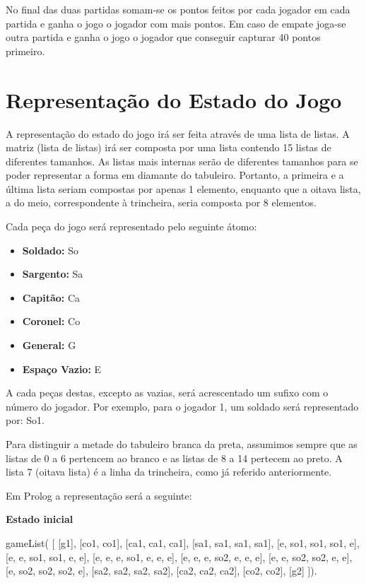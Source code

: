 \documentclass[a4paper]{article}
\begin{document}
No final das duas partidas somam-se os pontos feitos por cada jogador em cada partida e ganha o jogo o jogador com mais pontos. Em caso de empate joga-se outra partida e ganha o jogo o jogador que conseguir capturar 40 pontos primeiro. 

\newpage



\section{Representação do Estado do Jogo}

A representação do estado do jogo irá ser feita através de uma lista de listas. 
A matriz (lista de listas) irá ser composta por uma lista contendo 15 listas de diferentes tamanhos. As listas mais internas serão de diferentes tamanhos para se poder representar a forma em diamante do tabuleiro. Portanto, a primeira e a última lista seriam compostas por apenas 1 elemento, enquanto que a oitava lista, a do meio, correspondente à trincheira, seria composta por 8 elementos. 

Cada peça do jogo será representado pelo seguinte átomo: 

\begin{itemize}
	\item{\textbf{Soldado:} So}
	\item {\textbf{Sargento:} Sa}
	\item{\textbf{Capitão:} Ca}
	\item{\textbf{Coronel:} Co}
	\item{\textbf{General:} G}
	\item{\textbf{Espaço Vazio:} E}
\end{itemize}

A cada peças destas, excepto as vazias, será acrescentado um sufixo com o número do jogador. Por exemplo, para o jogador 1, um soldado será representado por: So1.

Para distinguir a metade do tabuleiro branca da preta, assumimos sempre que as listas de 0 a 6 pertencem ao branco e as listas de 8 a 14 pertecem ao preto. A lista 7 (oitava lista) é a linha da trincheira, como já referido anteriormente. 

Em Prolog a representação será a seguinte:

\vspace{1cm}

\textbf{Estado inicial}

gameList( [ [g1], 
		[co1, co1], 
		[ca1, ca1, ca1],
		[sa1, sa1, sa1, sa1], 
          		[e, so1, so1, so1, e], 
		[e, e, so1, so1, e, e], 
		[e, e, e, so1, e, e, e],
         		[e, e, e, so2, e, e, e],
		[e, e, so2, so2, e, e], 
		[e, so2, so2, so2, e], 
		[sa2, sa2, sa2, sa2],
         		[ca2, ca2, ca2], 
		[co2, co2],
 		[g2]  ]).
\end{document}
